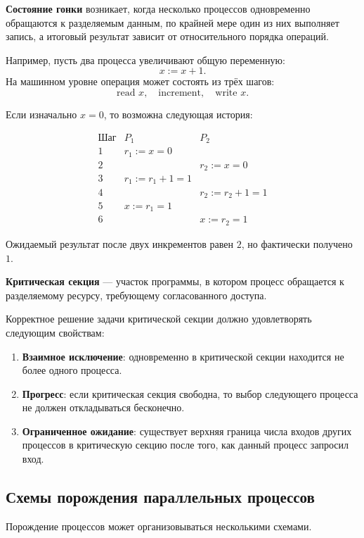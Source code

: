 \documentclass[12pt,a4paper]{article}
\begin{document}
\textbf{Состояние гонки} возникает, когда несколько процессов одновременно обращаются к разделяемым данным, по крайней мере один из них выполняет запись, а итоговый результат зависит от относительного порядка операций.

Например, пусть два процесса увеличивают общую переменную:
\[
x := x + 1.
\]
На машинном уровне операция может состоять из трёх шагов:
\[
\text{read } x,\quad \text{increment},\quad \text{write } x.
\]

Если изначально $x = 0$, то возможна следующая история:

\[
\begin{array}{c|c|c}
\text{Шаг} & P_1 & P_2 \\
\hline
1 & r_1 := x = 0 & \\
2 & & r_2 := x = 0 \\
3 & r_1 := r_1 + 1 = 1 & \\
4 & & r_2 := r_2 + 1 = 1 \\
5 & x := r_1 = 1 & \\
6 & & x := r_2 = 1
\end{array}
\]

Ожидаемый результат после двух инкрементов равен $2$, но фактически получено $1$.

\textbf{Критическая секция} --- участок программы, в котором процесс обращается к разделяемому ресурсу, требующему согласованного доступа.

Корректное решение задачи критической секции должно удовлетворять следующим свойствам:
\begin{enumerate}
    \item \textbf{Взаимное исключение}: одновременно в критической секции находится не более одного процесса.
    \item \textbf{Прогресс}: если критическая секция свободна, то выбор следующего процесса не должен откладываться бесконечно.
    \item \textbf{Ограниченное ожидание}: существует верхняя граница числа входов других процессов в критическую секцию после того, как данный процесс запросил вход.
\end{enumerate}

\subsection{Схемы порождения параллельных процессов}

Порождение процессов может организовываться несколькими схемами.
\end{document}
